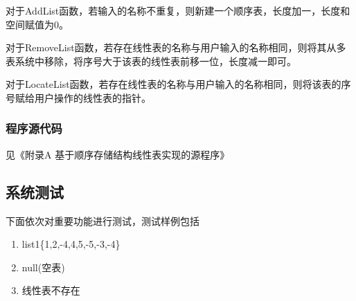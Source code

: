 \documentclass[supercite]{Experimental_Report}
\theoremstyle{definition}
\begin{document}
对于AddList函数，若输入的名称不重复，则新建一个顺序表，长度加一，长度和空间赋值为0。

对于RemoveList函数，若存在线性表的名称与用户输入的名称相同，则将其从多表系统中移除，将序号大于该表的线性表前移一位，长度减一即可。

对于LocateList函数，若存在线性表的名称与用户输入的名称相同，则将该表的序号赋给用户操作的线性表的指针。

\subsubsection{程序源代码}
见《附录A 基于顺序存储结构线性表实现的源程序》

\newpage

\subsection{系统测试}




下面依次对重要功能进行测试，测试样例包括
\begin{enumerate}
	\item list1\{1,2,-4,4,5,-5,-3,-4\}
	\item null(空表)
	\item 线性表不存在
\end{enumerate}
\end{document}

